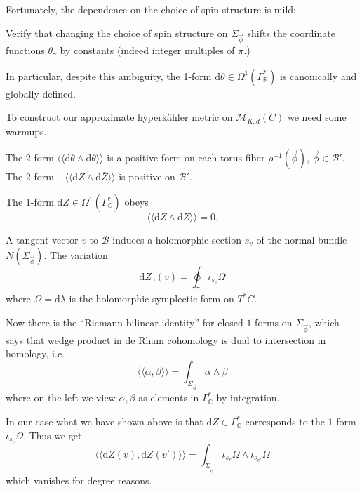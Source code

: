 \documentclass[12pt,letterpaper,reqno]{article}
\numberwithin{equation}{section}
\newcommand{\cB}{\ensuremath{\mathcal B}}
\newcommand{\cM}{\ensuremath{\mathcal M}}
\newcommand{\cH}{\ensuremath{\mathcal H}}
\newcommand{\R}{\ensuremath{\mathbb R}}
\newcommand{\C}{\ensuremath{\mathbb C}}
\newcommand{\hk}{hyperk\"ahler\xspace}
\newcommand{\de}{\mathrm{d}}
\newcommand{\IP}[1]{\langle#1\rangle}
\newcommand{\DIP}[1]{\langle\!\langle#1\rangle\!\rangle}
\newcommand{\fixme}[1]{{\color{orange}{[#1]}}}
\begin{document}
Fortunately, the dependence on the choice of spin structure is mild:

\begin{exercise} Verify that changing the choice of spin structure
on $\Sigma_{\vec \phi}$
shifts the coordinate functions $\theta_\gamma$ by constants (indeed integer
multiples of $\pi$.)
\end{exercise}

In particular, despite this ambiguity,
the 1-form $\de \theta \in \Omega^1(\Gamma^*_\R)$
is canonically and globally defined.


To construct our approximate \hk metric on $\cM_{K,d}(C)$ we need some
warmups.

\begin{prop} \label{prop:polarization}
The $2$-form $\DIP{\de \theta \wedge \de \theta}$ is a positive
form on each torus fiber $\rho^{-1}(\vec\phi)$, $\vec\phi \in \cB'$.
The $2$-form $-\DIP{\de Z \wedge \de \bar{Z}}$ is positive on
$\cB'$.
\end{prop}
\begin{pf} \fixme{...}
\end{pf}

\begin{prop} \label{prop:transversality}
The 1-form $\de Z \in \Omega^1(\Gamma^*_\C)$ obeys
\begin{equation}
  \DIP{\de Z \wedge \de Z} = 0.
\end{equation}
\end{prop}

\begin{pf} A tangent vector $v$ to $\cB$
induces a holomorphic section $s_v$ of the
normal bundle $N(\Sigma_{\vec \phi})$. The variation
$$\de Z_\gamma(v) = \oint_\gamma \iota_{s_v} \Omega$$
where $\Omega = \de \lambda$ is the holomorphic symplectic
form on $T^* C$.

Now there is the ``Riemann bilinear identity'' for closed $1$-forms
on $\Sigma_{\vec \phi}$, which says that wedge product in de Rham cohomology
is dual to intersection in homology, i.e.
$$ \DIP{\alpha,\beta} = \int_{\Sigma_{\vec\phi}} \alpha \wedge \beta
$$
where on the left we view $\alpha, \beta$ as elements
in $\Gamma^*_\C$ by integration.

In our case what we have shown above is that $\de Z \in \Gamma^*_\C$ corresponds
to the $1$-form $\iota_{s_v}\Omega$.
Thus we get
$$ \DIP{\de Z(v), \de Z(v')} = \int_{\Sigma_{\vec\phi}} \iota_{s_v} \Omega \wedge \iota_{s_{v'}} \Omega$$
which vanishes for degree reasons.
\end{pf}
\end{document}
